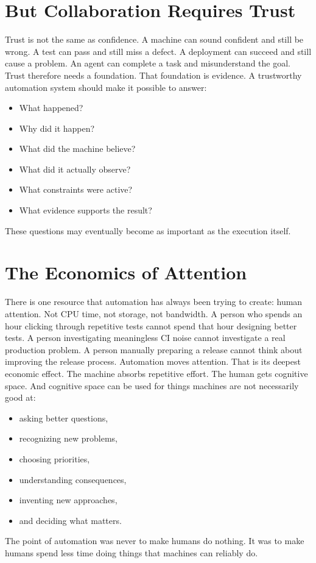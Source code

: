 \documentclass[11pt,twoside]{book}
\begin{document}
\section*{But Collaboration Requires Trust}

Trust is not the same as confidence.
A machine can sound confident and still be wrong.
A test can pass and still miss a defect.
A deployment can succeed and still cause a problem.
An agent can complete a task and misunderstand the goal.
Trust therefore needs a foundation.
That foundation is evidence.
A trustworthy automation system should make it possible to answer:
\begin{itemize}[nosep]
    \item What happened?
    \item Why did it happen?
    \item What did the machine believe?
    \item What did it actually observe?
    \item What constraints were active?
    \item What evidence supports the result?
\end{itemize}
These questions may eventually become as important as the execution itself.

\section*{The Economics of Attention}

There is one resource that automation has always been trying to create: human attention.
Not CPU time, not storage, not bandwidth.
A person who spends an hour clicking through repetitive tests cannot spend that hour designing better tests.
A person investigating meaningless CI noise cannot investigate a real production problem.
A person manually preparing a release cannot think about improving the release process.
Automation moves attention.
That is its deepest economic effect.
The machine absorbs repetitive effort.
The human gets cognitive space.
And cognitive space can be used for things machines are not necessarily good at:
\begin{itemize}[nosep]
    \item asking better questions,
    \item recognizing new problems,
    \item choosing priorities,
    \item understanding consequences,
    \item inventing new approaches,
    \item and deciding what matters.
\end{itemize}
The point of automation was never to make humans do nothing.
It was to make humans spend less time doing things that machines can reliably do.
\end{document}
